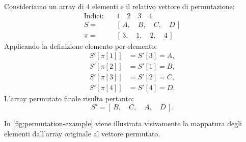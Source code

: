 \begin{example}
\label{ex:permutation-def}
Consideriamo un array di $4$ elementi e il relativo vettore di permutazione:
\begin{align*}
  \text{Indici:} \quad & 1 \quad 2 \quad 3 \quad 4 \\
  S = \quad & [\, A, \quad B, \quad C, \quad D \,] \\
  \pi = \quad & [\, 3, \quad 1, \quad 2, \quad 4 \,]
\end{align*}
Applicando la definizione elemento per elemento:
\begin{align*}
  S'[\pi[1]] &= S'[3] = A, \\
  S'[\pi[2]] &= S'[1] = B, \\
  S'[\pi[3]] &= S'[2] = C, \\
  S'[\pi[4]] &= S'[4] = D.
\end{align*}
L'array permutato finale risulta pertanto:
\[
  S' = [\, B, \quad C, \quad A, \quad D \,].
\]
\end{example}

In \autoref{fig:permutation-example} viene illustrata visivamente la mappatura degli elementi dall'array originale al vettore permutato.

